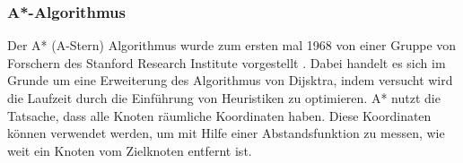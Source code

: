  

\subsubsection{A*-Algorithmus}
Der A* (A-Stern) Algorithmus wurde zum ersten mal 1968 von einer Gruppe von Forschern des Stanford Research Institute vorgestellt \cite{aStern}. 
Dabei handelt es sich im Grunde um eine Erweiterung des Algorithmus von Dijsktra, indem versucht wird die Laufzeit durch die Einführung von Heuristiken zu optimieren.\newline
A* nutzt die Tatsache, dass alle Knoten räumliche Koordinaten haben. Diese Koordinaten können verwendet werden, um mit Hilfe einer Abstandsfunktion zu messen, wie weit ein Knoten vom Zielknoten entfernt ist.\newline

